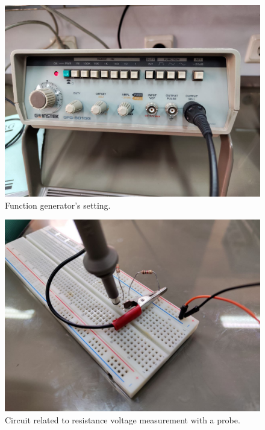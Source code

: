 \documentclass[11pt]{article}
\newcommand{\PicScale}{0.2}
\begin{document}
\begin{question}
{        \begin{figure}[H]
            \begin{center}
                \includegraphics[scale=\PicScale]{Fig/32.jpeg}
                \caption{Function generator's setting.}
            \end{center}
        \end{figure}

        \begin{figure}[H]
            \begin{center}
                \includegraphics[scale=\PicScale]{Fig/33.jpeg}
                \caption{Circuit related to resistance voltage measurement with a probe.}
            \end{center}
        \end{figure}

}
\end{question}
\end{document}
